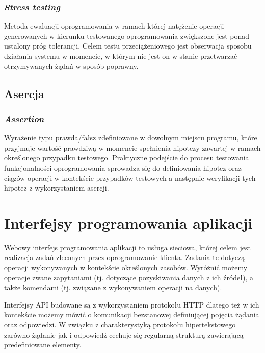 \subsubsection{\textit{Stress testing}}
Metoda ewaluacji oprogramowania w ramach której natężenie operacji generowanych w kierunku testowanego oprogramowania zwiększone jest ponad ustalony próg tolerancji. Celem testu przeciążeniowego jest obserwacja sposobu działania systemu w momencie, w którym nie jest on w stanie przetwarzać otrzymywanych żądań w sposób poprawny.

\subsection*{Asercja}
\subsubsection{\textit{Assertion}}
Wyrażenie typu prawda/fałsz zdefiniowane w dowolnym miejscu programu, które przyjmuje wartość prawdziwą w momencie spełnienia hipotezy zawartej w ramach określonego przypadku testowego. Praktyczne podejście do procesu testowania funkcjonalności oprogramowania sprowadza się do definiowania hipotez oraz ciągów operacji w kontekście przypadków testowych a następnie weryfikacji tych hipotez z wykorzystaniem asercji.

\section{Interfejsy programowania aplikacji}
\label{sec:api-teoria}
Webowy interfejs programowania aplikacji to usługa sieciowa, której celem jest realizacja zadań zleconych przez oprogramowanie klienta. Zadania te dotyczą operacji wykonywanych w kontekście określonych zasobów. Wyróżnić możemy operacje zwane zapytaniami (tj. dotyczące pozyskiwania danych z ich źródeł), a także komendami (tj. związane z wykonywaniem operacji na danych).

Interfejsy API budowane są z wykorzystaniem protokołu HTTP dlatego też w ich kontekście możemy mówić o komunikacji bezstanowej definiującej pojęcia żądania oraz odpowiedzi. W związku z charakterystyką protokołu hipertekstowego zarówno żądanie jak i odpowiedź cechuje się regularną strukturą zawierającą predefiniowane elementy.

